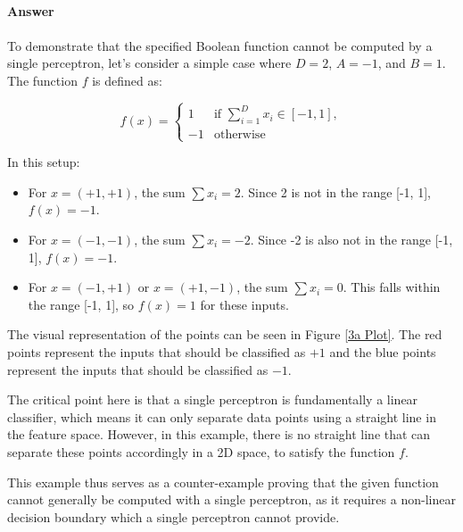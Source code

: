 \documentclass{article}
\begin{document}
\subsection{}
\subsubsection{}
\paragraph{Answer}

To demonstrate that the specified Boolean function cannot be computed by a single perceptron, let's consider a simple case where \( D = 2 \), \( A = -1 \), and \( B = 1 \). The function \( f \) is defined as:

\[
f(x) = 
\begin{cases} 
1 & \text{if } \sum_{i=1}^{D} x_i \in [-1, 1], \\
-1 & \text{otherwise}
\end{cases}
\]

In this setup:

\begin{itemize}
    \item For \( x = (+1, +1) \), the sum \( \sum x_i = 2 \). Since 2 is not in the range [-1, 1], \( f(x) = -1 \).
    \item For \( x = (-1, -1) \), the sum \( \sum x_i = -2 \). Since -2 is also not in the range [-1, 1], \( f(x) = -1 \).
    \item For \( x = (-1, +1) \) or \( x = (+1, -1) \), the sum \( \sum x_i = 0 \). This falls within the range [-1, 1], so \( f(x) = 1 \) for these inputs.
\end{itemize}

The visual representation of the points can be seen in Figure \ref{3a Plot}. The red points represent the inputs that should be classified as \( +1 \) and the blue points represent the inputs that should be classified as \( -1 \).

The critical point here is that a single perceptron is fundamentally a linear classifier, which means it can only separate data points using a straight line in the feature space. However, in this example, there is no straight line that can separate these points accordingly in a 2D space, to satisfy the function \( f \).

This example thus serves as a counter-example proving that the given function cannot generally be computed with a single perceptron, as it requires a non-linear decision boundary which a single perceptron cannot provide. 
\end{document}
